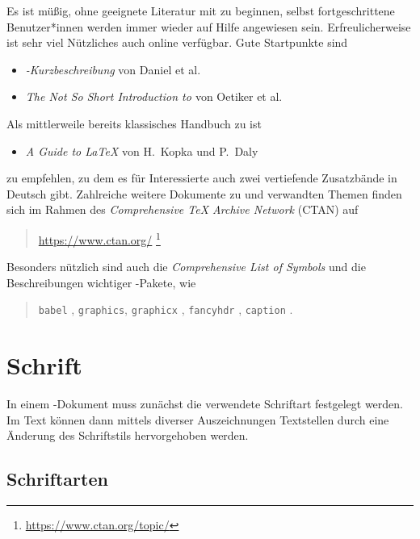 Es ist müßig, ohne geeignete Literatur mit \latex zu beginnen, selbst
fortgeschrittene Benutzer*innen werden immer wieder auf Hilfe angewiesen
sein. Erfreulicherweise ist sehr viel Nützliches auch online verfügbar.
Gute Startpunkte sind \zB
%
\begin{itemize}
\item \emph{\textrm{\LaTeXe}-Kurzbeschreibung} von Daniel et al.\ \cite{Daniel2018}
\item \emph{The Not So Short Introduction to \textrm{\LaTeXe}}
            von Oetiker et al.\ \cite{Oetiker2018}
\end{itemize}
%
\noindent
Als mittlerweile bereits klassisches Handbuch zu \latex ist
%
\begin{itemize}
  \item \emph{A Guide to \textrm{\LaTeX}} von H.~Kopka und P.~Daly \cite{Kopka2003}
\end{itemize}
%
zu empfehlen, zu dem es für Interessierte auch zwei vertiefende
Zusatzbände in Deutsch gibt. Zahlreiche weitere Dokumente zu
\latex und verwandten Themen finden sich \ua im Rahmen des {\em
Comprehensive TeX Archive Network} (CTAN) auf
\begin{quote}
	\url{https://www.ctan.org/}%
	\footnote{\url{https://www.ctan.org/topic/}}
\end{quote}
%
Besonders nützlich sind auch die
\emph{Comprehensive List of \textrm{\latex} Symbols} \cite{Pakin2020}
und die Beschreibungen wichtiger \latex-Pakete, wie
%
\begin{quote}
  \texttt{babel} \cite{Bezos2020},\newline
  \texttt{graphics}, \texttt{graphicx} \cite{Carlisle2020},\newline
  \texttt{fancyhdr} \cite{Oostrum2019},\newline
  \texttt{caption} \cite{Sommerfeldt2020}.
\end{quote}


\section{Schrift}

In einem \latex-Dokument muss zunächst die verwendete Schriftart festgelegt werden. Im Text können dann mittels diverser Auszeichnungen Textstellen durch eine Änderung des Schriftstils hervorgehoben werden.

\subsection{Schriftarten}

